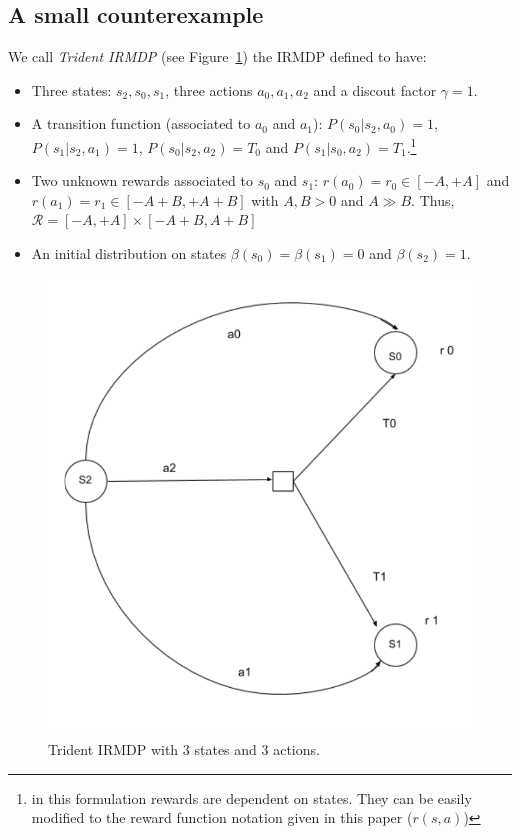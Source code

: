 \subsection{A small counterexample}

We call \textit{Trident IRMDP} (see Figure~\ref{fig:trident}) the IRMDP defined to have:
\begin{itemize}
\item Three states: $s_2, s_0, s_1$, three actions $a_0, a_1, a_2$ and a discout factor $\gamma=1$.
\item A transition function (associated to $a_0$ and $a_1$): $P(s_0 | s_2,a_0)=1$, $P(s_1 |s_2 ,a_1)=1$, $P(s_0 | s_2, a_2) = T_0$ and $P(s_1 | s_0, a_2) = T_1$.\footnote{in this formulation rewards are dependent on states. They can be easily modified to the reward function notation given in this paper ($r(s, a)$)} 	 
\item Two unknown rewards associated to $s_0$ and $s_1$: $r(a_0)= r_0 \in [-A,+A]$ and $r(a_1)= r_1 \in [-A+B,+A+B]$ with $A,B > 0$ and $A \gg B$. Thus, $\mathcal{R} = [-A, +A]\times[-A+B, A+B]$
\item An initial distribution on states $\beta(s_0)= \beta(s_1) = 0$ and $\beta(s_2)=1$.

\end{itemize} 

\begin{figure}[]
	\begin{center}
    \includegraphics[scale=0.4]{images/Trident_MDP.pdf}
	\end{center}
	\caption{Trident IRMDP with $3$ states and $3$ actions.}
	\label{fig:trident} 
\end{figure}

